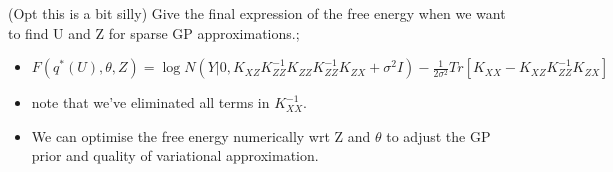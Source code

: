 \documentclass{article}
\begin{document}
(Opt this is a bit silly) Give the final expression of the free energy when we want to find U and Z for sparse GP approximations.; \begin{itemize}
    \item $F(q^*(U), \theta, Z)=\log N(Y|0, K_{XZ}K^{-1}_{ZZ}K_{ZZ}K_{ZZ}^{-1}K_{ZX}+\sigma^2I) -\frac{1}{2\sigma^2}Tr[K_{XX}-K_{XZ}K_{ZZ}^{-1}K_{ZX}]$
    \item note that we've eliminated all terms in $K_{XX}^{-1}$.
    \item We can optimise the free energy numerically  wrt Z and $\theta$ to adjust the GP prior and quality of variational approximation.
\end{itemize}
\end{document}

